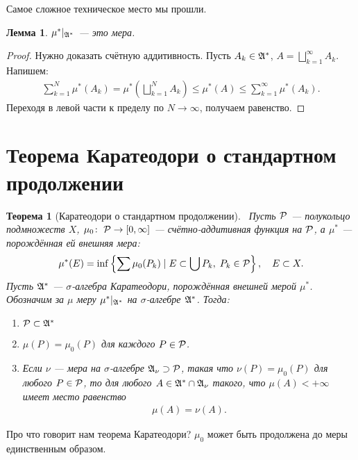 \documentclass[a4paper,12pt]{article}
\newcounter{theoremCnt}
\theoremstyle{definition}
\theoremstyle{plain}
\newtheorem{thm}[theoremCnt]{Теорема}
\theoremstyle{plain}
\newtheorem{lm}[theoremCnt]{Лемма}
\theoremstyle{plain}
\theoremstyle{plain}
\theoremstyle{definition}
\theoremstyle{definition}
\theoremstyle{definition}
\theoremstyle{definition}
\theoremstyle{definition}
\theoremstyle{definition}
\theoremstyle{plain}
\theoremstyle{plain}
\theoremstyle{plain}
\theoremstyle{plain}
\theoremstyle{definition}
\theoremstyle{definition}
\theoremstyle{definition}
\theoremstyle{definition}
\theoremstyle{definition}
\newcommand{\A}{\ensuremath \mathfrak{A}}
\newcommand{\p}{\ensuremath \mathcal{P}}
\begin{document}
Самое сложное техническое место мы прошли.
\begin{lm}
 $ \mu^\ast \rvert_{\A^\ast} $ --- это мера.
\end{lm}
\begin{proof}
 Нужно доказать счётную аддитивность. Пусть $ A_k \in \A^\ast $, $ A = \bigsqcup_{k=1}^\infty A_k $. Напишем:
 \begin{align*}
  \sum_{k=1}^{N} \mu^\ast(A_k) = \mu^\ast\left( \bigsqcup_{k=1}^N A_k \right) \leqslant \mu^\ast(A) \leqslant \sum_{k=1}^{\infty}  \mu^\ast(A_k)
 .\end{align*} Переходя в левой части к пределу по $ N \to \infty $, получаем равенство.
\end{proof}
\section{Теорема Каратеодори о стандартном продолжении}
\begin{thm}[Каратеодори о стандартном продолжении]\
 Пусть $ \p $ --- полукольцо подмножеств $ X $, $ \mu_0 \colon\; \p \to [0, \infty] $ --- счётно-аддитивная функция на $ \p $, а $ \mu^\ast $ --- порождённая ей внешняя мера:
 \begin{align*}
  \mu^\ast(E) = \inf \left\{ \sum \mu_0(P_k) \mid E \subset \bigcup P_k,\; P_k \in \p \right\}, \quad E \subset X
 .\end{align*} Пусть $ \A^\ast $ --- $ \sigma $-алгебра Каратеодори, порождённая внешней мерой $ \mu^\ast $. Обозначим за $ \mu $ меру $ \mu^\ast \rvert_{\A^\ast} $ на $ \sigma $-алгебре $ \A^\ast $. Тогда:
 \begin{enumerate}
  \item $ \p \subset \A^\ast $
  \item $ \mu(P) = \mu_0(P) $ для каждого $ P \in \p $.
  \item Если $ \nu $ --- мера на $ \sigma $-алгебре $ \A_\nu \supset \p $, такая что $ \nu(P) = \mu_0(P) $ для любого $ P \in \p $, то для любого $ A \in \A^\ast \cap \A_\nu $ такого, что $ \mu(A) < +\infty $ имеет место равенство
   \begin{align*}
    \mu(A) = \nu(A)
   .\end{align*}
 \end{enumerate}
\end{thm}
Про что говорит нам теорема Каратеодори? $ \mu_0 $ может быть продолжена до меры единственным образом.
\end{document}
